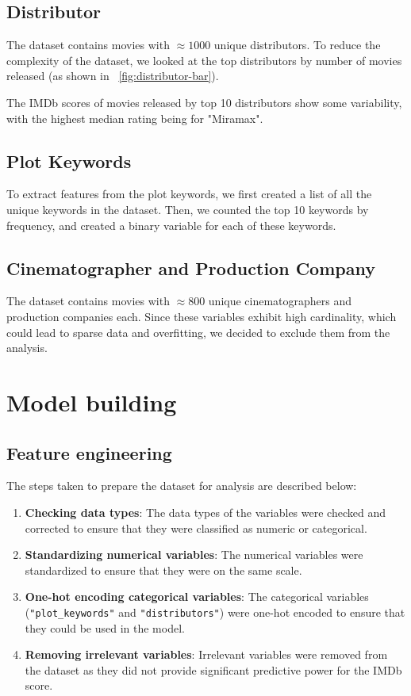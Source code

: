 \documentclass[12pt,a4paper]{article}
\begin{document}
\subsection{Distributor}\label{subsec:distributor}
The dataset contains movies with $\approx 1000$ unique distributors.
To reduce the complexity of the dataset, we looked at the top distributors by number of movies released (as shown in \figurename~\ref{fig:distributor-bar}).


The IMDb scores of movies released by top 10 distributors show some variability, with the highest median rating being for "Miramax".

\subsection{Plot Keywords}\label{subsec:plot-keywords}
To extract features from the plot keywords, we first created a list of all the unique keywords in the dataset.
Then, we counted the top 10 keywords by frequency, and created a binary variable for each of these keywords.

\subsection{Cinematographer and Production Company}\label{subsec:cinematographer_production_company}
The dataset contains movies with $\approx 800$ unique cinematographers and production companies each.
Since these variables exhibit high cardinality, which could lead to sparse data and overfitting, we decided to exclude them from the analysis.

\section{Model building}\label{sec:model-building}
\subsection{Feature engineering}\label{subsec:data-preprocessing}

The steps taken to prepare the dataset for analysis are described below:
\begin{enumerate}
    \item \textbf{Checking data types}: The data types of the variables were checked and corrected to ensure that they were classified as numeric or categorical.
    \item \textbf{Standardizing numerical variables}: The numerical variables were standardized to ensure that they were on the same scale.
    \item \textbf{One-hot encoding categorical variables}: The categorical variables (\texttt{"plot\_keywords"} and \texttt{"distributors"}) were one-hot encoded to ensure that they could be used in the model.
    \item \textbf{Removing irrelevant variables}: Irrelevant variables were removed from the dataset as they did not provide significant predictive power for the IMDb score.
\end{enumerate}
\end{document}
